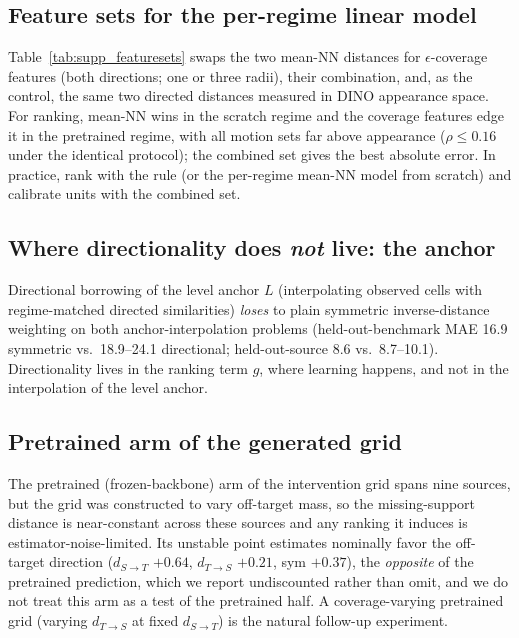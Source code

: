 \documentclass[runningheads]{llncs}
\newcommand{\dtb}{d_{S\to T}}
\newcommand{\dbt}{d_{T\to S}}
\begin{document}
\subsection{Feature sets for the per-regime linear model}
Table~\ref{tab:supp_featuresets} swaps the two mean-NN distances for
$\epsilon$-coverage features (both directions; one or three radii), their
combination, and, as the control, the same two directed distances measured
in DINO appearance space. For ranking, mean-NN wins in the scratch regime
and the coverage features edge it in the pretrained regime, with all motion
sets far above appearance ($\rho \le 0.16$ under the identical protocol);
the combined set gives the best absolute error. In practice,
rank with the rule (or the per-regime mean-NN model from scratch) and calibrate
units with the combined set.

\begin{table}[h]
\centering
\caption{Per-regime linear model under different feature sets. MAE is
held-out-source, anchor $+$ model.}
\label{tab:supp_featuresets}
\scriptsize
\setlength{\tabcolsep}{3.5pt}

\end{table}

\subsection{Where directionality does \emph{not} live: the anchor}
Directional borrowing of the level anchor $L$ (interpolating observed cells
with regime-matched directed similarities) \emph{loses} to plain symmetric
inverse-distance weighting on both anchor-interpolation problems
(held-out-benchmark MAE 16.9 symmetric vs.\ 18.9--24.1 directional;
held-out-source 8.6 vs.\ 8.7--10.1). Directionality lives in the ranking term
$g$, where learning happens, and not in the interpolation of the level anchor.

\subsection{Pretrained arm of the generated grid}
The pretrained (frozen-backbone) arm of the intervention grid spans nine
sources, but the grid was constructed to vary off-target mass, so the
missing-support distance is near-constant across these sources and any ranking
it induces is estimator-noise-limited. Its unstable point estimates nominally
favor the off-target direction ($\dtb$ $+0.64$, $\dbt$ $+0.21$, sym $+0.37$),
the \emph{opposite} of the pretrained prediction, which we report
undiscounted rather than omit, and we do not treat this arm as a test of the
pretrained half. A coverage-varying pretrained grid (varying $\dbt$ at fixed
$\dtb$) is the natural follow-up experiment.
\end{document}
